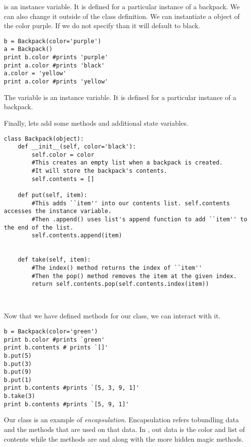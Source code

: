  is an instance variable. It is defined for a particular instance of a backpack.
We can also change it outside of the class definition.
We can instantiate a  object of the color purple. If we do not specify than it will default to black.

\begin{lstlisting}
b = Backpack(color='purple')
a = Backpack()
print b.color #prints 'purple'
print a.color #prints 'black'
a.color = 'yellow'
print a.color #prints 'yellow'
\end{lstlisting}

The variable  is an instance variable.
It is defined for a particular instance of a backpack.

Finally, lets add some methods and additional state variables.

\begin{lstlisting}
class Backpack(object):
    def __init__(self, color='black'):
        self.color = color
        #This creates an empty list when a backpack is created. 
        #It will store the backpack's contents.
        self.contents = []

    def put(self, item):
        #This adds ``item'' into our contents list. self.contents accesses the instance variable.
        #Then .append() uses list's append function to add ``item'' to the end of the list.
        self.contents.append(item) 
        
        
    def take(self, item):
        #The index() method returns the index of ``item''
        #Then the pop() method removes the item at the given index.
        return self.contents.pop(self.contents.index(item)) 
        
        
\end{lstlisting}

Now that we have defined methods for our  class, we can interact with it.


\begin{lstlisting}
b = Backpack(color='green')
print b.color #prints `green'
print b.contents # prints `[]'
b.put(5)
b.put(3)
b.put(9)
b.put(1)
print b.contents #prints `[5, 3, 9, 1]'
b.take(3)
print b.contents #prints `[5, 9, 1]'
\end{lstlisting}

Our  class is an example of \emph{encapsulation}.
Encapsulation refers tobundling data and the methods that are used on that data.
In , out data is the color and list of contents while the methods are  and  along with the more hidden magic methods.

